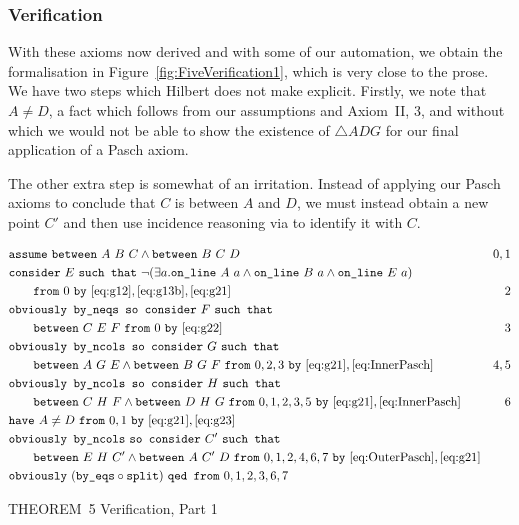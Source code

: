 \subsubsection{Verification}
With these axioms now derived and with some of our automation, we obtain the formalisation in Figure~\ref{fig:FiveVerification1}, which is very close to the prose. We have two steps which Hilbert does not make explicit. Firstly, we note that $A\neq D$, a fact which follows from our assumptions and Axiom~II, 3, and without which we would not be able to show the existence of $\triangle ADG$ for our final application of a Pasch axiom.

The other extra step is somewhat of an irritation. Instead of applying our Pasch axioms to conclude that $C$ is between $A$ and $D$, we must instead obtain a new point $C'$ and then use incidence reasoning via  to identify it with $C$. 

\begin{boxedfigure}
\scriptsize
  \begin{align*}
    &\code{assume}\ \between{A}{B}{C} \wedge \between{B}{C}{D} & 0,1\\
    &\code{consider}\ E\ \code{such that}\ \Triangle{a}{A}{B}{E}\\
    &\qquad\code{from}\ 0\ \code{by}\ \eqref{eq:g12},\eqref{eq:g13b},\eqref{eq:g21} & 2\\
    &\code{obviously by\_neqs so consider}\ F\ \code{such that}\\
    &\qquad\between{C}{E}{F}\ \code{from}\ 0\ \code{by}\ \eqref{eq:g22} & 3\\
    &\code{obviously by\_ncols so consider}\ G\ \code{such that}\\ 
    &\qquad\between{A}{G}{E} \wedge \between{B}{G}{F}\ \code{from}\ 0,2,3\ \code{by}\
    \eqref{eq:g21},\eqref{eq:InnerPasch}& 4,5\\    
    &\code{obviously by\_ncols so consider}\ H\ \code{such that}\\ 
    &\qquad\between{C}{H}{F} \wedge \between{D}{H}{G}\ \code{from}\ 0,1,2,3,5\ \code{by}\ \eqref{eq:g21},\eqref{eq:InnerPasch}& 6\\
    &\code{have}\ A\neq D\ \code{from}\ 0,1\ \code{by}\ \eqref{eq:g21},\eqref{eq:g23}\\
    &\code{obviously by\_ncols}\ \code{so consider}\ C'\ \code{such that}\\
    &\qquad\between{E}{H}{C'}\wedge\between{A}{C'}{D}\ \code{from}\ 0,1,2,4,6,7\ \code{by}\ \eqref{eq:OuterPasch},\eqref{eq:g21}\\
    &\code{obviously}\ (\code{by\_eqs}\circ\code{split})\ \code{qed from}\ 0,1,2,3,6,7
  \end{align*}
  \caption{THEOREM~5 Verification, Part 1}
  \label{fig:FiveVerification1}
\end{boxedfigure}

